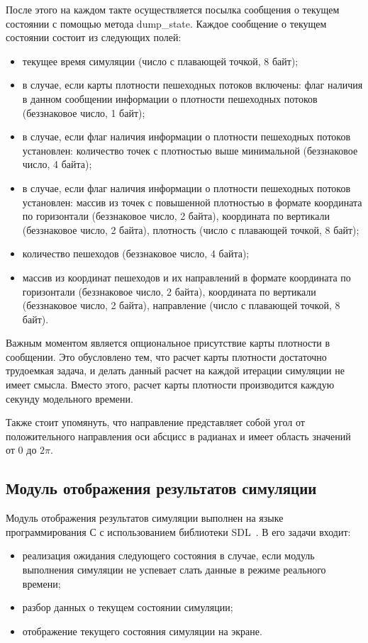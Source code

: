 После этого на каждом такте осуществляется посылка сообщения о текущем состоянии с помощью метода dump\_state.
Каждое сообщение о текущем состоянии состоит из следующих полей:
\begin{itemize}
  \item текущее время симуляции (число с плавающей точкой, 8 байт);
  \item в случае, если карты плотности пешеходных потоков включены: флаг наличия в данном сообщении информации о плотности пешеходных потоков (беззнаковое число, 1 байт);
  \item в случае, если флаг наличия информации о плотности пешеходных потоков установлен: количество точек с плотностью выше минимальной (беззнаковое число, 4 байта);
  \item в случае, если флаг наличия информации о плотности пешеходных потоков установлен: массив из точек с повышенной плотностью в формате
    координата по горизонтали (беззнаковое число, 2 байта), координата по вертикали (беззнаковое число, 2 байта), плотность (число с плавающей точкой, 8 байт);
  \item количество пешеходов (беззнаковое число, 4 байта);
  \item массив из координат пешеходов и их направлений в формате
    координата по горизонтали (беззнаковое число, 2 байта), координата по вертикали (беззнаковое число, 2 байта), направление (число с плавающей точкой, 8 байт).
\end{itemize}

Важным моментом является опциональное присутствие карты плотности в сообщении.
Это обусловлено тем, что расчет карты плотности достаточно трудоемкая задача, и делать данный расчет на каждой итерации симуляции не имеет смысла.
Вместо этого, расчет карты плотности производится каждую секунду модельного времени.

Также стоит упомянуть, что направление представляет собой угол от положительного направления оси абсцисс в радианах и имеет область значений от $0$ до $2\pi$.

\subsection{Модуль отображения результатов симуляции}
\label{sec:development:animator}

Модуль отображения результатов симуляции выполнен на языке программирования С с использованием библиотеки SDL~\cite{libsdl_home}.
В его задачи входит:
\begin{itemize}
  \item реализация ожидания следующего состояния в случае, если модуль выполнения симуляции не успевает слать данные в режиме реального времени;
  \item разбор данных о текущем состоянии симуляции;
  \item отображение текущего состояния симуляции на экране.
\end{itemize}

